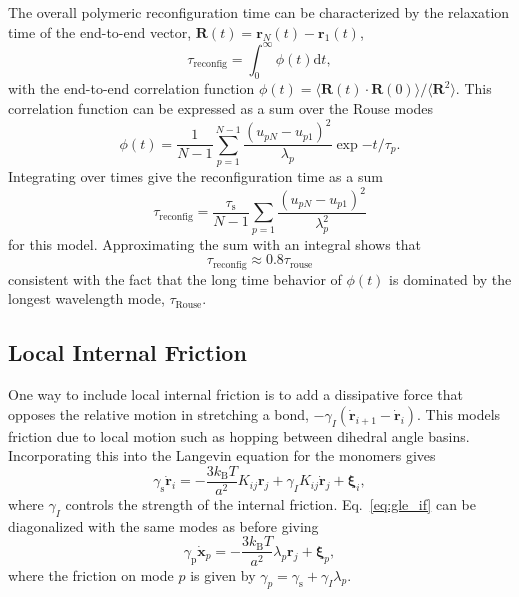 \documentclass[../talant.diss.submit.tex]{subfiles}
\begin{document}
The overall polymeric reconfiguration time can be characterized by the
relaxation time of the end-to-end vector,
$\bm{R}(t) = \bm{r}_N(t) - \bm{r}_1(t)$,
\begin{equation}
  \label{eq:reconfig}
  \tau_{\mathrm{reconfig}} = \int_0^\infty \phi(t) \mathrm{d}t,
\end{equation}
%
with the end-to-end correlation function
$\phi(t) = \langle \bm{R}(t)\cdot\bm{R}(0)\rangle/\langle \bm{R}^2\rangle$. This
correlation function can be expressed as a sum over the Rouse modes
%
\begin{equation}
  \label{eq:autocorr}
 \phi(t) = 
  \frac{1}{N-1}\sum_{p=1}^{N-1} \frac{(u_{pN} - u_{p1})^{2}}{\lambda_{p}}
  \exp{ - t/\tau_p}.
\end{equation}
Integrating over times give the reconfiguration time as a sum
\begin{equation}
  \label{eq:reconfig2}
  \tau_\mathrm{reconfig} = \frac{\tau_\mathrm{s}}{N-1}\sum_{p=1} \frac{(u_{pN} - u_{p1})^{2}}{\lambda_{p}^2}
\end{equation}
for this model. Approximating the sum with an integral shows that \cite{cheng:13}
\begin{equation}
  \label{eq:reconfig3}
  \tau_\mathrm{reconfig} \approx 0.8\tau_\mathrm{rouse}
\end{equation}
consistent with the fact that the long time behavior of $\phi(t)$ is dominated by the
longest wavelength mode, $\tau_\mathrm{Rouse}$.



\subsection{\textbf{Local Internal Friction}}
One way to include local internal friction is to add a dissipative force that
opposes the relative motion in stretching a bond,
$-\gamma_I (\dot{\bm{r}}_{i+1} - \dot{\bm{r}}_{i})$.\cite{bazua:73}
This models friction due to
local motion such as hopping between dihedral angle basins. Incorporating this
into the Langevin equation for the monomers gives
\begin{equation}
  \label{eq:gle_if}
  \gamma_\mathrm{s} \dot{\bm{r}}_i 
   = - \frac{3 k_\mathrm{B}T}{a^2} K_{ij}\bm{r}_j +  \gamma_I K_{ij} \dot{\bm{r}}_j+ \bm{\xi}_i,
\end{equation}
where $\gamma_I$ controls the strength of the internal friction. Eq.~\ref{eq:gle_if}
can be diagonalized with the same modes as before giving
\begin{equation}
  \label{eq:gle_if}
    \gamma_\mathrm{p} \dot{\bm{x}}_p 
   = - \frac{3 k_\mathrm{B}T}{a^2} \lambda_p\bm{r}_j + \bm{\xi}_p,
\end{equation}
where the friction on mode $p$ is given by $\gamma_p = \gamma_\mathrm{s} + \gamma_{I}\lambda_p$.
\end{document}
